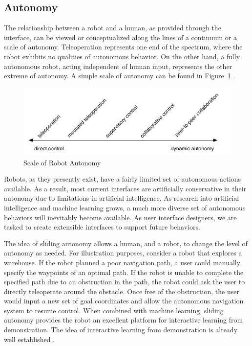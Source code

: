 \subsection{Autonomy}
\label{sub:autonomy}

The relationship between a robot and a human, as provided through the interface, can be viewed or conceptualized along the lines of a continuum or a scale of autonomy. Teleoperation represents one end of the spectrum, where the robot exhibits no qualities of autonomous behavior. On the other hand, a fully autonomous robot, acting independent of human input, represents the other extreme of autonomy. A simple scale of autonomy can be found in Figure~\ref{fig:autonomy} \cite{Goodrich_Survey}.

\begin{figure}[ht]
\begin{center}
\includegraphics[width=5in]{images/autonomy.pdf}
\caption{Scale of Robot Autonomy\label{fig:autonomy}}
\end{center}
\end{figure}

Robots, as they presently exist, have a fairly limited set of autonomous actions available. As a result, most current interfaces are artificially conservative in their autonomy due to limitations in artificial intelligence. As research into artificial intelligence and machine learning grows, a much more diverse set of autonomous behaviors will inevitably become available. As user interface designers, we are tasked to create extensible interfaces to support future behaviors.

The idea of sliding autonomy allows a human, and a robot, to change the level of autonomy as needed. For illustration purposes, consider a robot that explores a warehouse. If the robot planned a poor navigation path, a user could manually specify the waypoints of an optimal path. If the robot is unable to complete the specified path due to an obstruction in the path, the robot could ask the user to directly teleoperate around the obstacle. Once free of the obstruction, the user would input a new set of goal coordinates and allow the autonomous navigation system to resume control. When combined with machine learning, sliding autonomy provides the robot an excellent platform for interactive learning from demonstration. The idea of interactive learning from demonstration is already well established \cite{GWAP} \cite{Grollman}.

